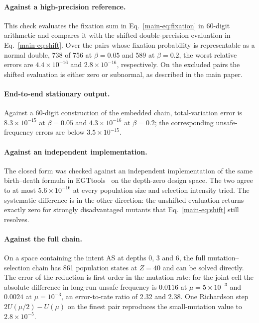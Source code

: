 \documentclass[a4paper,fleqn]{cas-sc}
\newcommand{\AS}{\textsf{AS}}
\begin{document}
\paragraph{Against a high-precision reference.}
This check evaluates the fixation sum in Eq.~\eqref{main-eq:fixation} in 60-digit
arithmetic and compares it with the shifted double-precision evaluation in
Eq.~\eqref{main-eq:shift}. Over the pairs whose fixation probability is representable
as a normal double, 738 of 756 at $\beta=0.05$ and 589 at $\beta=0.2$, the worst
relative errors are $4.4\times10^{-16}$ and $2.8\times10^{-16}$, respectively.
On the excluded pairs the shifted evaluation is either zero or subnormal, as
described in the main paper.

\paragraph{End-to-end stationary output.}
Against a 60-digit construction of the embedded chain, total-variation error
is $8.3\times10^{-15}$ at $\beta=0.05$ and $4.3\times10^{-16}$ at $\beta=0.2$;
the corresponding unsafe-frequency errors are below $3.5\times10^{-15}$.

\paragraph{Against an independent implementation.}
The closed form was checked against an independent implementation of the same
birth--death formula in EGTtools~\citep{domingos2023egttools} on the depth-zero
design space. The two agree to at most $5.6\times10^{-16}$ at every population
size and selection intensity tried. The systematic difference is in the other
direction: the unshifted evaluation returns exactly zero for strongly
disadvantaged mutants that Eq.~\eqref{main-eq:shift} still resolves.

\paragraph{Against the full chain.}
On a space containing the intent \AS{} at depths 0, 3 and 6, the full
mutation--selection chain has 861 population states at $Z=40$ and can be solved
directly. The error of the reduction is first order in the mutation rate: for
the joint cell the absolute difference in long-run unsafe frequency is $0.0116$
at $\mu=5\times10^{-3}$ and $0.0024$ at $\mu=10^{-3}$, an error-to-rate ratio
of 2.32 and 2.38. One Richardson step $2U(\mu/2)-U(\mu)$ on the finest pair
reproduces the small-mutation value to $2.8\times10^{-5}$.
\end{document}
